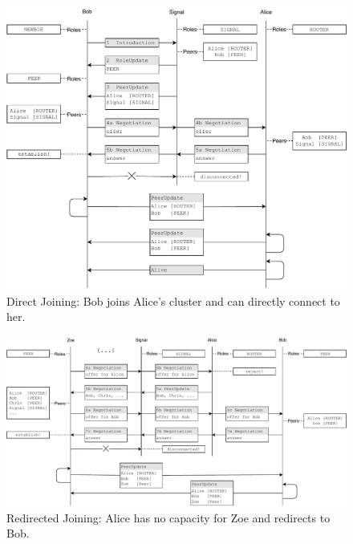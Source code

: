 \begin{figure}
\centering
\includegraphics[width=1\textwidth]{graphics/design/peer-join.pdf}
\caption{Direct Joining: Bob joins Alice's cluster and can directly connect to her.}
\label{fig:peer-join}
\end{figure}

\begin{figure}
\centering
\includegraphics[width=1\textwidth]{graphics/design/join-redirect.pdf}
\caption{Redirected Joining: Alice has no capacity for Zoe and redirects to Bob.}
\label{fig:peer-redirect}
\end{figure}
